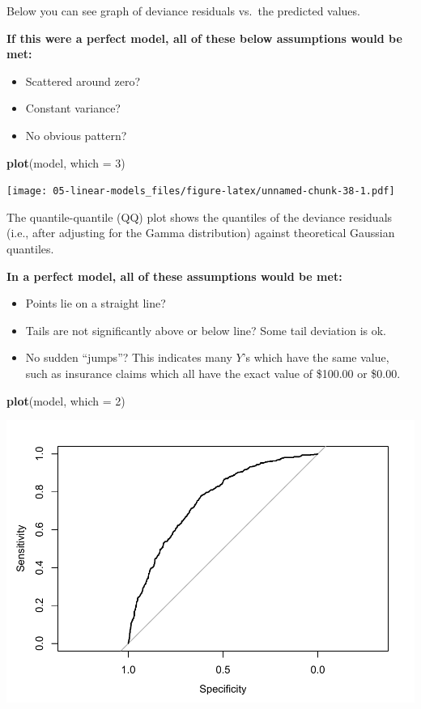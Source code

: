 \documentclass[openany]{book}
\newenvironment{Shaded}{\begin{snugshade}}{\end{snugshade}}
\newcommand{\DataTypeTok}[1]{\textcolor[rgb]{0.13,0.29,0.53}{#1}}
\newcommand{\DecValTok}[1]{\textcolor[rgb]{0.00,0.00,0.81}{#1}}
\newcommand{\KeywordTok}[1]{\textcolor[rgb]{0.13,0.29,0.53}{\textbf{#1}}}
\newcommand{\NormalTok}[1]{#1}
\providecommand{\tightlist}{%
  \setlength{\itemsep}{0pt}\setlength{\parskip}{0pt}}
\begin{document}
Below you can see graph of deviance residuals vs.~the predicted values.

\textbf{If this were a perfect model, all of these below assumptions would be met:}

\begin{itemize}
\tightlist
\item
  Scattered around zero?
\item
  Constant variance?
\item
  No obvious pattern?
\end{itemize}

\begin{Shaded}
\begin{Highlighting}[]
\KeywordTok{plot}\NormalTok{(model, }\DataTypeTok{which =} \DecValTok{3}\NormalTok{)}
\end{Highlighting}
\end{Shaded}

\texttt{[image: 05-linear-models\_files/figure-latex/unnamed-chunk-38-1.pdf]}

The quantile-quantile (QQ) plot shows the quantiles of the deviance residuals (i.e., after adjusting for the Gamma distribution) against theoretical Gaussian quantiles.

\textbf{In a perfect model, all of these assumptions would be met:}

\begin{itemize}
\tightlist
\item
  Points lie on a straight line?\\
\item
  Tails are not significantly above or below line? Some tail deviation is ok.
\item
  No sudden ``jumps''? This indicates many \(Y\)'s which have the same value, such as insurance claims which all have the exact value of \$100.00 or \$0.00.
\end{itemize}

\begin{Shaded}
\begin{Highlighting}[]
\KeywordTok{plot}\NormalTok{(model, }\DataTypeTok{which =} \DecValTok{2}\NormalTok{)}
\end{Highlighting}
\end{Shaded}

\includegraphics{05-linear-models_files/figure-latex/unnamed-chunk-39-1.pdf}
\end{document}
